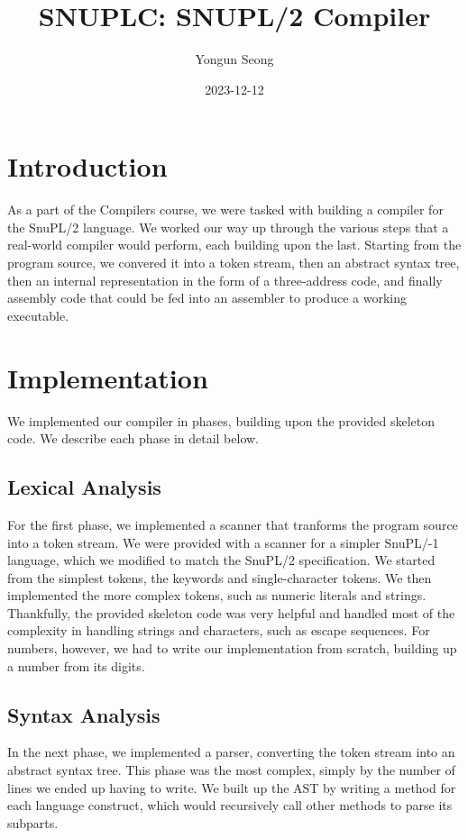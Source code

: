 \documentclass{article}
\title{SNUPLC: SNUPL/2 Compiler}
\author{Yongun Seong}
\date{2023-12-12}
\begin{document}
\maketitle
\tableofcontents
\newpage

\section{Introduction}

As a part of the Compilers course, we were tasked with building a compiler for
the SnuPL/2 language. We worked our way up through the various steps that a
real-world compiler would perform, each building upon the last. Starting from
the program source, we convered it into a token stream, then an abstract syntax
tree, then an internal representation in the form of a three-address code, and
finally assembly code that could be fed into an assembler to produce a working
executable.

\section{Implementation}

We implemented our compiler in phases, building upon the provided skeleton code.
We describe each phase in detail below.

\subsection{Lexical Analysis}

For the first phase, we implemented a scanner that tranforms the program source
into a token stream. We were provided with a scanner for a simpler SnuPL/-1
language, which we modified to match the SnuPL/2 specification. We started from
the simplest tokens, the keywords and single-character tokens. We then
implemented the more complex tokens, such as numeric literals and strings.
Thankfully, the provided skeleton code was very helpful and handled most of the
complexity in handling strings and characters, such as escape sequences. For
numbers, however, we had to write our implementation from scratch, building up a
number from its digits.

\subsection{Syntax Analysis}

In the next phase, we implemented a parser, converting the token stream into an
abstract syntax tree. This phase was the most complex, simply by the number of
lines we ended up having to write. We built up the AST by writing a method for
each language construct, which would recursively call other methods to parse its
subparts.
\end{document}
